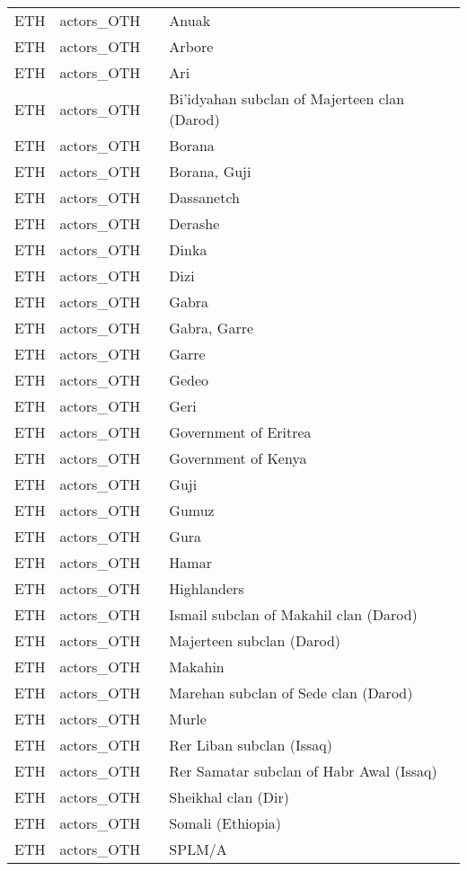 \begin{table}[ht]
\begin{tabular}{llll}
  ETH & actors\_OTH &  & Anuak \\ 
  ETH & actors\_OTH &  & Arbore \\ 
  ETH & actors\_OTH &  & Ari \\ 
  ETH & actors\_OTH &  & Bi'idyahan subclan of Majerteen clan (Darod) \\ 
  ETH & actors\_OTH &  & Borana \\ 
  ETH & actors\_OTH &  & Borana, Guji \\ 
  ETH & actors\_OTH &  & Dassanetch \\ 
  ETH & actors\_OTH &  & Derashe \\ 
  ETH & actors\_OTH &  & Dinka \\ 
  ETH & actors\_OTH &  & Dizi \\ 
  ETH & actors\_OTH &  & Gabra \\ 
  ETH & actors\_OTH &  & Gabra, Garre \\ 
  ETH & actors\_OTH &  & Garre \\ 
  ETH & actors\_OTH &  & Gedeo \\ 
  ETH & actors\_OTH &  & Geri \\ 
  ETH & actors\_OTH &  & Government of Eritrea \\ 
  ETH & actors\_OTH &  & Government of Kenya \\ 
  ETH & actors\_OTH &  & Guji \\ 
  ETH & actors\_OTH &  & Gumuz \\ 
  ETH & actors\_OTH &  & Gura \\ 
  ETH & actors\_OTH &  & Hamar \\ 
  ETH & actors\_OTH &  & Highlanders \\ 
  ETH & actors\_OTH &  & Ismail subclan of Makahil clan (Darod) \\ 
  ETH & actors\_OTH &  & Majerteen subclan (Darod) \\ 
  ETH & actors\_OTH &  & Makahin \\ 
  ETH & actors\_OTH &  & Marehan subclan of Sede clan (Darod) \\ 
  ETH & actors\_OTH &  & Murle \\ 
  ETH & actors\_OTH &  & Rer Liban subclan (Issaq) \\ 
  ETH & actors\_OTH &  & Rer Samatar subclan of Habr Awal (Issaq) \\ 
  ETH & actors\_OTH &  & Sheikhal clan (Dir) \\ 
  ETH & actors\_OTH &  & Somali (Ethiopia) \\ 
  ETH & actors\_OTH &  & SPLM/A \\ 

\end{tabular}
\end{table}
